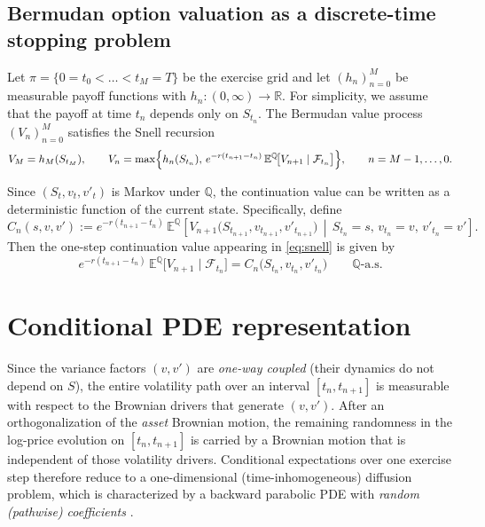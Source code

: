 \documentclass[10pt]{article}
\theoremstyle{plain}
\theoremstyle{definition}
\theoremstyle{remark}
\newcommand{\E}{\mathbb E}
\newcommand{\Q}{\mathbb Q}
\newcommand{\R}{\mathbb R}
\begin{document}
\subsection{Bermudan option valuation as a discrete-time stopping problem}

Let $\pi=\{0=t_0<\dots<t_M=T\}$ be the exercise grid and let $(h_n)_{n=0}^M$ be measurable payoff
functions with $h_n:(0,\infty)\to\R$. For simplicity, we assume that the payoff at time $t_n$
depends only on $S_{t_n}$.
The Bermudan value process $(V_n)_{n=0}^M$ satisfies the Snell recursion
\begin{equation}\label{eq:snell}
V_M=h_M(S_{t_M}),\qquad
V_n=\max\Bigl\{h_n(S_{t_n}),\,e^{-r(t_{n+1}-t_n)}\,\E^\Q\!\bigl[V_{n+1}\mid\mathcal F_{t_n}\bigr]\Bigr\},
\qquad n=M-1,\dots,0.
\end{equation}

Since $(S_t,v_t,v'_t)$ is Markov under $\Q$, the continuation value can be
written as a deterministic function of the current state. Specifically, define
\begin{equation}\label{eq:cont}
C_n(s,v,v')
:=e^{-r(t_{n+1}-t_n)}\,\E^\Q\!\left[
V_{n+1}\bigl(S_{t_{n+1}},v_{t_{n+1}},v'_{t_{n+1}}\bigr)\,
\middle|\,
S_{t_n}=s,\,v_{t_n}=v,\,v'_{t_n}=v'
\right].
\end{equation}
Then the one-step continuation value appearing in \eqref{eq:snell} is given by
\[
e^{-r(t_{n+1}-t_n)}\,\E^\Q\!\bigl[V_{n+1}\mid\mathcal F_{t_n}\bigr]
= C_n\bigl(S_{t_n},v_{t_n},v'_{t_n}\bigr)\qquad\text{$\Q$-a.s.}
\]

\section{Conditional PDE representation}\label{sec:conditional_pde}
Since the variance factors $(v,v')$ are \emph{one-way coupled} (their dynamics do not depend on $S$),
the entire volatility path over an interval $[t_n,t_{n+1}]$ is measurable with respect to the Brownian drivers
that generate $(v,v')$. After an orthogonalization of the \emph{asset} Brownian motion, the remaining randomness
in the log-price evolution on $[t_n,t_{n+1}]$ is carried by a Brownian motion that is independent of those
volatility drivers. Conditional expectations over one exercise step therefore reduce to a one-dimensional
(time-inhomogeneous) diffusion problem, which is characterized by a backward parabolic PDE with
\emph{random (pathwise) coefficients} \citet{farahany2020mixing}.
\end{document}
